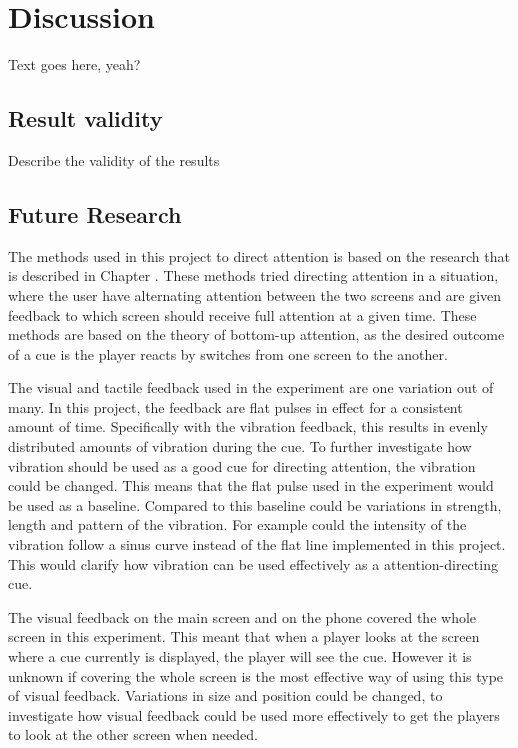 \chapter{Discussion}\label{ch:discussion}
Text goes here, yeah?

\section{Result validity}\label{sec:result_validity}
Describe the validity of the results

\section{Future Research}\label{sec:future_research}
The methods used in this project to direct attention is based on the research that is described in Chapter . These methods tried directing attention in a situation, where the user have alternating attention between the two screens and are given feedback to which screen should receive full attention at a given time. These methods are based on the theory of bottom-up attention, as the desired outcome of a cue is the player reacts by switches from one screen to the another.

The visual and tactile feedback used in the experiment are one variation out of many. In this project, the feedback are flat pulses in effect for a consistent amount of time. Specifically with the vibration feedback, this results in evenly distributed amounts of vibration during the cue. To further investigate how vibration should be used as a good cue for directing attention, the vibration could be changed. This means that the flat pulse used in the experiment would be used as a baseline. Compared to this baseline could be variations in strength, length and pattern of the vibration. For example could the intensity of the vibration follow a sinus curve instead of the flat line implemented in this project. This would clarify how vibration can be used effectively as a attention-directing cue.

The visual feedback on the main screen and on the phone covered the whole screen in this experiment. This meant that when a player looks at the screen where a cue currently is displayed, the player will see the cue. However it is unknown if covering the whole screen is the most effective way of using this type of visual feedback. Variations in size and position could be changed, to investigate how visual feedback could be used more effectively to get the players to look at the other screen when needed.

